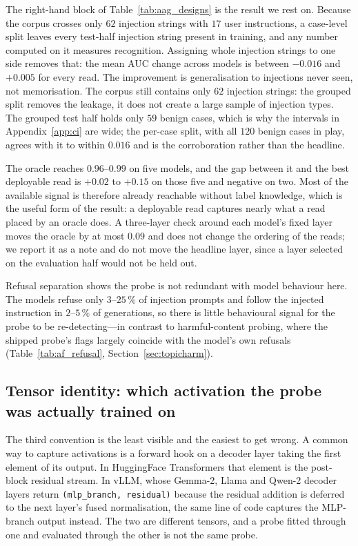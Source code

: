 The right-hand block of Table~\ref{tab:aag_designs} is the result we rest on. Because the corpus crosses only $62$
injection strings with $17$ user instructions, a case-level split leaves every test-half injection string present in
training, and any number computed on it measures recognition. Assigning whole injection strings to one side removes
that: the mean AUC change across models is between $-0.016$ and $+0.005$ for every read. The improvement is
generalisation to injections never seen, not memorisation. The corpus still contains only $62$ injection strings: the
grouped split removes the leakage, it does not create a large sample of injection types. The grouped test half holds
only $59$ benign cases, which
is why the intervals in Appendix~\ref{app:ci} are wide; the per-case split, with all $120$ benign cases in play,
agrees with it to within $0.016$ and is the corroboration rather than the headline.

The oracle reaches $0.96$--$0.99$ on five models, and the gap between it and the best deployable read is $+0.02$ to
$+0.15$ on those five and negative on two. Most of the available signal is therefore already reachable without label
knowledge, which is the useful form of the result: a deployable read captures nearly what a read placed by an oracle
does. A three-layer check around each model's fixed layer moves the oracle by at most $0.09$ and does not change the
ordering of the reads; we report it as a note and do not move the headline layer, since a layer selected on the
evaluation half would not be held out.

Refusal separation shows the probe is not redundant with model behaviour here. The models refuse only $3$--$25\,\%$ of
injection prompts and follow the injected instruction in $2$--$5\,\%$ of generations, so there is little behavioural
signal for the probe to be re-detecting---in contrast to harmful-content probing, where the shipped probe's flags
largely coincide with the model's own refusals (Table~\ref{tab:af_refusal}, Section~\ref{sec:topicharm}).

\subsection{Tensor identity: which activation the probe was actually trained on}
\label{sec:tensor}

The third convention is the least visible and the easiest to get wrong. A common way to capture activations is a
forward hook on a decoder layer taking the first element of its output. In HuggingFace Transformers that element is
the post-block residual stream. In vLLM, whose Gemma-2, Llama and Qwen-2 decoder layers return
\texttt{(mlp\_branch, residual)} because the residual addition is deferred to the next layer's fused normalisation,
the same line of code captures the MLP-branch output instead. The two are different tensors, and a probe fitted
through one and evaluated through the other is not the same probe.

